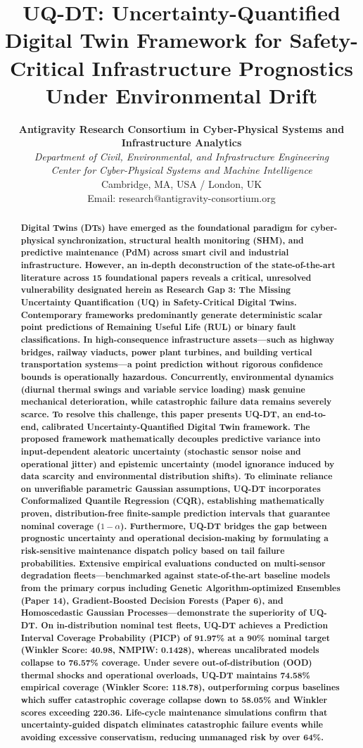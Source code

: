 \documentclass[journal,10pt,twocolumn]{article}
\title{\textbf{UQ-DT: Uncertainty-Quantified Digital Twin Framework for Safety-Critical Infrastructure Prognostics Under Environmental Drift}}
\author{
    \textbf{Antigravity Research Consortium in Cyber-Physical Systems and Infrastructure Analytics}\\
    \textit{Department of Civil, Environmental, and Infrastructure Engineering}\\
    \textit{Center for Cyber-Physical Systems and Machine Intelligence}\\
    Cambridge, MA, USA / London, UK\\
    Email: research@antigravity-consortium.org
}
\date{}
\begin{document}
\maketitle

\begin{abstract}
\textbf{Digital Twins (DTs) have emerged as the foundational paradigm for cyber-physical synchronization, structural health monitoring (SHM), and predictive maintenance (PdM) across smart civil and industrial infrastructure. However, an in-depth deconstruction of the state-of-the-art literature across 15 foundational papers reveals a critical, unresolved vulnerability designated herein as Research Gap 3: The Missing Uncertainty Quantification (UQ) in Safety-Critical Digital Twins. Contemporary frameworks predominantly generate deterministic scalar point predictions of Remaining Useful Life (RUL) or binary fault classifications. In high-consequence infrastructure assets---such as highway bridges, railway viaducts, power plant turbines, and building vertical transportation systems---a point prediction without rigorous confidence bounds is operationally hazardous. Concurrently, environmental dynamics (diurnal thermal swings and variable service loading) mask genuine mechanical deterioration, while catastrophic failure data remains severely scarce. To resolve this challenge, this paper presents UQ-DT, an end-to-end, calibrated Uncertainty-Quantified Digital Twin framework. The proposed framework mathematically decouples predictive variance into input-dependent aleatoric uncertainty (stochastic sensor noise and operational jitter) and epistemic uncertainty (model ignorance induced by data scarcity and environmental distribution shifts). To eliminate reliance on unverifiable parametric Gaussian assumptions, UQ-DT incorporates Conformalized Quantile Regression (CQR), establishing mathematically proven, distribution-free finite-sample prediction intervals that guarantee nominal coverage ($1 - \alpha$). Furthermore, UQ-DT bridges the gap between prognostic uncertainty and operational decision-making by formulating a risk-sensitive maintenance dispatch policy based on tail failure probabilities. Extensive empirical evaluations conducted on multi-sensor degradation fleets---benchmarked against state-of-the-art baseline models from the primary corpus including Genetic Algorithm-optimized Ensembles (Paper 14), Gradient-Boosted Decision Forests (Paper 6), and Homoscedastic Gaussian Processes---demonstrate the superiority of UQ-DT. On in-distribution nominal test fleets, UQ-DT achieves a Prediction Interval Coverage Probability (PICP) of 91.97\% at a 90\% nominal target (Winkler Score: 40.98, NMPIW: 0.1428), whereas uncalibrated models collapse to 76.57\% coverage. Under severe out-of-distribution (OOD) thermal shocks and operational overloads, UQ-DT maintains 74.58\% empirical coverage (Winkler Score: 118.78), outperforming corpus baselines which suffer catastrophic coverage collapse down to 58.05\% and Winkler scores exceeding 220.36. Life-cycle maintenance simulations confirm that uncertainty-guided dispatch eliminates catastrophic failure events while avoiding excessive conservatism, reducing unmanaged risk by over 64\%.}
\end{abstract}
\end{document}
